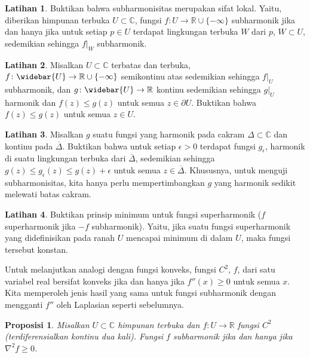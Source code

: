 \documentclass[12pt,openany]{book}
\newcommand{\C}{{\mathbb{C}}}
\newcommand{\R}{{\mathbb{R}}}
\theoremstyle{plain}
\newtheorem{prop}[thm]{Proposisi}
\theoremstyle{remark}
\theoremstyle{definition}
\newenvironment{exbox}{%
    \def\FrameCommand{\vrule width 1pt \relax\hspace{10pt}}%
    \MakeFramed{\advance\hsize-\width\FrameRestore}%
}{%
    \endMakeFramed
}
\theoremstyle{exercise}
\newtheorem{exercise}{Latihan}[section]
\theoremstyle{example}
\newcommand{\propref}[1]{\hyperref[#1]{Proposisi~\ref*{#1}}}
\begin{document}
\begin{exbox}
\begin{exercise}
Buktikan bahwa subharmonisitas merupakan sifat lokal.  Yaitu, diberikan himpunan terbuka
$U \subset \C$, fungsi $f \colon U \to \R \cup \{ -\infty \}$ subharmonik jika
dan hanya jika untuk setiap $p \in U$ terdapat lingkungan terbuka $W$ dari $p$,
$W \subset U$, sedemikian sehingga $f|_{W}$ subharmonik.
\end{exercise}

\begin{exercise}
Misalkan $U \subset \C$ terbatas dan terbuka, $f \colon \widebar{U} \to \R
\cup \{-\infty\}$ semikontinu atas sedemikian sehingga $f|_U$
subharmonik, dan $g \colon \widebar{U} \to \R$ kontinu
sedemikian sehingga $g|_U$ harmonik dan
$f(z) \leq g(z)$ untuk semua $z \in \partial U$.  Buktikan bahwa
$f(z) \leq g(z)$ untuk semua $z \in U$.
\end{exercise}

\begin{exercise}
Misalkan $g$ suatu fungsi
yang harmonik pada cakram $\Delta \subset \C$ dan kontinu pada
$\overline{\Delta}$.  Buktikan bahwa untuk setiap $\epsilon > 0$ terdapat
fungsi $g_\epsilon$, harmonik di suatu lingkungan terbuka dari $\overline{\Delta}$,
sedemikian sehingga $g(z) \leq g_\epsilon(z) \leq g(z)+\epsilon$ untuk semua $z \in
\overline{\Delta}$.
Khususnya, untuk menguji subharmonisitas, kita hanya perlu mempertimbangkan
$g$ yang harmonik sedikit melewati batas cakram.
\end{exercise}

\begin{exercise}
Buktikan prinsip minimum untuk fungsi superharmonik ($f$
superharmonik jika $-f$ subharmonik).  Yaitu, jika suatu fungsi superharmonik
yang didefinisikan pada ranah $U$ mencapai minimum di dalam $U$, maka fungsi tersebut
konstan.
\end{exercise}
\end{exbox}

Untuk melanjutkan analogi dengan fungsi konveks, fungsi $C^2$, $f$, dari satu
variabel real bersifat konveks jika dan hanya jika $f''(x) \geq 0$ untuk semua $x$.
Kita memperoleh jenis hasil yang sama untuk fungsi subharmonik 
dengan mengganti $f''$ oleh Laplasian seperti sebelumnya.


\begin{prop} \label{prop:C2subharmonic}
Misalkan $U \subset \C$ himpunan terbuka dan $f \colon U \to \R$ fungsi $C^2$
(terdiferensialkan kontinu dua kali).
Fungsi $f$ subharmonik jika dan hanya jika
$\nabla^2 f \geq 0$.
\end{prop}
\end{document}
